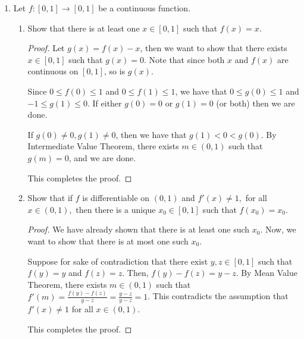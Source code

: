 \documentclass[11pt]{article}
\renewcommand{\_}[1]{\underline{ #1 }}
\theoremstyle{definition}
\numberwithin{equation}{subsection}
\begin{document}
\begin{enumerate}
\begin{enumerate}
\begin{proof}
Taylor series.



\renewcommand\qedsymbol{QED}
\end{proof}



\end{enumerate}

\item
Let $f:[0,1]\longrightarrow [0,1]$ be a continuous function.
\begin{enumerate}
\item[i)] Show that there is at least one $x\in[0,1]$ such that $f(x)=x.$ 

\begin{proof}
Let $g(x)=f(x)-x$, then we want to show that there exists $x\in [0,1]$ such that $g(x)=0$. Note that since both $x$ and $f(x)$ are continuous on $[0,1]$, so is $g(x)$.

Since $0 \leq f(0)\leq 1$ and $0 \leq f(1)\leq 1$, we have that $0 \leq g(0)\leq 1$ and $-1 \leq g(1)\leq 0$. If either $g(0)=0$ or $g(1)=0$ (or both) then we are done. 

If $g(0)\neq 0, g(1)\neq 0$, then we have that $g(1)<0<g(0)$. By Intermediate Value Theorem, there exists $m\in (0,1)$ such that $g(m)=0$, and we are done.

This completes the proof.

\renewcommand\qedsymbol{QED}
\end{proof}


\item[ii)] Show that if $f$ is differentiable on $(0,1)$ and $f'(x)\neq 1,$ for all $x\in (0,1),$ then there 
is a unique $x_0\in[0,1]$ such that $f(x_0)=x_0.$ 

\begin{proof}
We have already shown that there is at least one such $x_0$. Now, we want to show that there is at most one such $x_0$.

Suppose for sake of contradiction that there exist $y,z\in [0,1]$ such that $f(y)=y$ and $f(z)=z$. Then, $f(y)-f(z)=y-z$. By Mean Value Theorem, there exists $m\in (0,1)$ such that $f'(m)=\frac{f(y)-f(z)}{y-z}=\frac{y-z}{y-z}=1$. This contradicts the assumption that $f'(x)\neq 1$ for all $x\in (0,1)$.

This completes the proof.

\renewcommand\qedsymbol{QED}
\end{proof}


\end{enumerate}



\end{enumerate}
\end{document}

